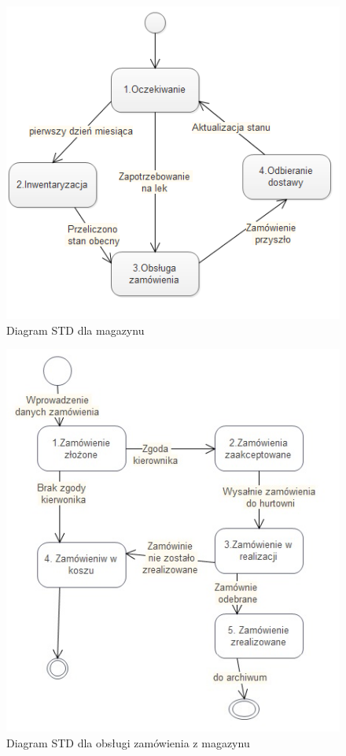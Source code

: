 \documentclass[a4paper, 11pt]{article}
\begin{document}
	\begin{figure}[H]
\centerline{\includegraphics[scale=1]{STDmagazyn.png}}
\caption{Diagram STD dla magazynu}
\end{figure}
	\begin{figure}[H]
\centerline{\includegraphics[scale=1]{STDzamowienie2.jpg}}
\caption{Diagram STD dla obsługi zamówienia z magazynu}
\end{figure}
\end{document}
